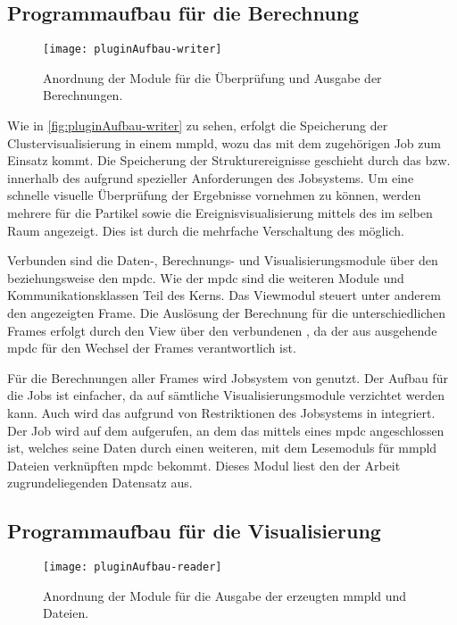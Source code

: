 \subsection*{Programmaufbau für die Berechnung}\label{sec:pluginaufbau-calc}
\begin{figure}
	\texttt{[image: pluginAufbau-writer]}
	\caption{Anordnung der  Module für die Überprüfung und Ausgabe der Berechnungen.}\label{fig:pluginAufbau-writer}
\end{figure}

Wie in \autoref{fig:pluginAufbau-writer} zu sehen, erfolgt die Speicherung der Clustervisualisierung in einem \gls{mmpld}, wozu das  mit dem zugehörigen Job zum Einsatz kommt. Die Speicherung der Strukturereignisse geschieht durch das  bzw. innerhalb des \SECalc aufgrund spezieller Anforderungen des  Jobsystems. Um eine schnelle visuelle Überprüfung der Ergebnisse vornehmen zu können, werden mehrere  für die Partikel sowie die Ereignisvisualisierung mittels des  im selben Raum angezeigt. Dies ist durch die mehrfache Verschaltung des  möglich.

Verbunden sind die Daten-, Berechnungs- und Visualisierungsmodule über den \SEDC beziehungsweise den \gls{mpdc}. Wie der \gls{mpdc} sind die weiteren Module und Kommunikationsklassen Teil des  Kerns. Das Viewmodul steuert unter anderem den angezeigten Frame. Die Auslösung der Berechnung für die unterschiedlichen Frames erfolgt durch den View über den verbundenen , da der aus \SECalc ausgehende \gls{mpdc} für den Wechsel der Frames verantwortlich ist.

Für die Berechnungen aller Frames wird Jobsystem von  genutzt. Der Aufbau für die Jobs ist einfacher, da auf sämtliche Visualisierungsmodule verzichtet werden kann. Auch wird das  aufgrund von Restriktionen des Jobsystems in \SECalc integriert. Der Job wird auf dem  aufgerufen, an dem das \SECalc mittels eines \gls{mpdc} angeschlossen ist, welches seine Daten durch einen weiteren, mit dem Lesemoduls für \gls{mmpld} Dateien verknüpften \gls{mpdc} bekommt. Dieses Modul liest den der Arbeit zugrundeliegenden Datensatz aus.

\subsection*{Programmaufbau für die Visualisierung}\label{sec:pluginaufbau-vis}
\begin{figure}
	\texttt{[image: pluginAufbau-reader]}
	\caption{Anordnung der  Module für die Ausgabe der erzeugten \gls{mmpld} und \MMSE Dateien.}\label{fig:pluginAufbau-reader}
\end{figure}

